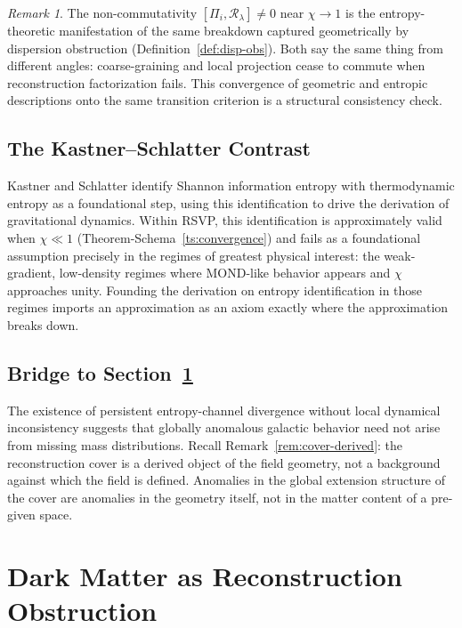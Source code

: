 \documentclass[11pt, a4paper]{article}
\theoremstyle{plain}
\theoremstyle{definition}
\theoremstyle{remark}
\newtheorem{remark}[theorem]{Remark}
\newcommand{\Rcoarse}{\mathcal{R}_\lambda}
\begin{document}
\begin{remark}
The non-commutativity $[\Pi_i, \Rcoarse] \neq 0$ near $\chi \to 1$ is the entropy-
theoretic manifestation of the same breakdown captured geometrically by dispersion
obstruction (Definition~\ref{def:disp-obs}). Both say the same thing from different
angles: coarse-graining and local projection cease to commute when reconstruction
factorization fails. This convergence of geometric and entropic descriptions onto the
same transition criterion is a structural consistency check.
\end{remark}

\subsection{The Kastner--Schlatter Contrast}

Kastner and Schlatter \cite{kastner2024} identify Shannon information entropy with
thermodynamic entropy as a foundational step, using this identification to drive the
derivation of gravitational dynamics. Within RSVP, this identification is
approximately valid when $\chi \ll 1$ (Theorem-Schema~\ref{ts:convergence}) and
fails as a foundational assumption precisely in the regimes of greatest physical
interest: the weak-gradient, low-density regimes where MOND-like behavior appears
and $\chi$ approaches unity. Founding the derivation on entropy identification in
those regimes imports an approximation as an axiom exactly where the approximation
breaks down.

\subsection{Bridge to Section~\ref{sec:darkmatter}}

The existence of persistent entropy-channel divergence without local dynamical
inconsistency suggests that globally anomalous galactic behavior need not arise from
missing mass distributions. Recall Remark~\ref{rem:cover-derived}: the reconstruction
cover is a derived object of the field geometry, not a background against which the
field is defined. Anomalies in the global extension structure of the cover are
anomalies in the geometry itself, not in the matter content of a pre-given space.

\section{Dark Matter as Reconstruction Obstruction}
\label{sec:darkmatter}
\end{document}
